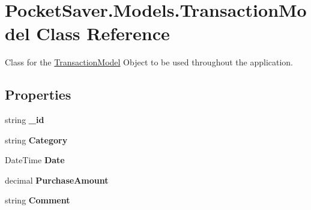 \hypertarget{class_pocket_saver_1_1_models_1_1_transaction_model}{}\section{Pocket\+Saver.\+Models.\+Transaction\+Model Class Reference}
\label{class_pocket_saver_1_1_models_1_1_transaction_model}


Class for the \hyperlink{class_pocket_saver_1_1_models_1_1_transaction_model}{Transaction\+Model} Object to be used throughout the application.  


\subsection*{Properties}
\begin{DoxyCompactItemize}
\item 
\mbox{\label{class_pocket_saver_1_1_models_1_1_transaction_model_a66392d6b5d8574181ea9db65bf2b3308}} 
string {\bfseries \+\_\+id}
\item 
\mbox{\label{class_pocket_saver_1_1_models_1_1_transaction_model_a8ea4b5bbb326f50ceb55a8ad8503a0f3}} 
string {\bfseries Category}
\item 
\mbox{\label{class_pocket_saver_1_1_models_1_1_transaction_model_a41781f1e8223daefb26255ecdac60724}} 
Date\+Time {\bfseries Date}
\item 
\mbox{\label{class_pocket_saver_1_1_models_1_1_transaction_model_a2332c4ad1344019a701fea92f2bc415e}} 
decimal {\bfseries Purchase\+Amount}
\item 
\mbox{\label{class_pocket_saver_1_1_models_1_1_transaction_model_abb22b0967b66b4e99788edfdeee157a0}} 
string {\bfseries Comment}
\end{DoxyCompactItemize}


